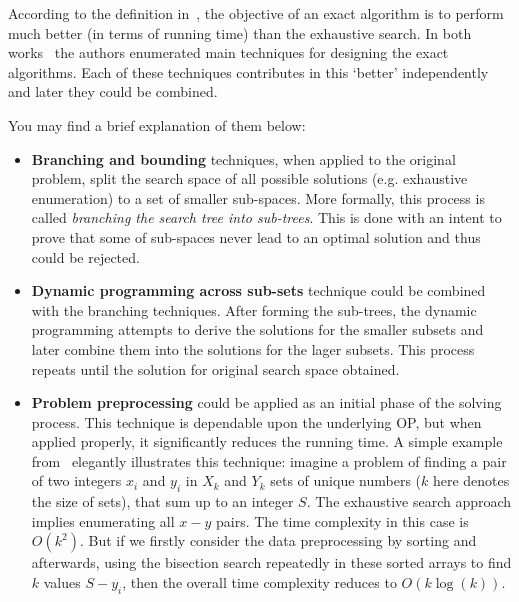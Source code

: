 According to the definition in~\cite{fomin2013exact}, the objective of an exact algorithm is to perform much better (in terms of running time) than the exhaustive search. In both works~\cite{woeginger2003exact,fomin2013exact} the authors enumerated main techniques for designing the exact algorithms. Each of these techniques contributes in this `better' independently and later they could be combined.

You may find a brief explanation of them below:
\begin{itemize}
	\item \textbf{Branching and bounding} techniques, when applied to the original problem, split the search space of all possible solutions (e.g. exhaustive enumeration) to a set of smaller sub-spaces. More formally, this process is called \emph{branching the search tree into sub-trees}. This is done with an intent to prove that some of sub-spaces never lead to an optimal solution and thus could be rejected.
	
	\item \textbf{Dynamic programming across sub-sets} technique could be combined with the  branching techniques. After forming the sub-trees, the dynamic programming attempts to derive the solutions for the smaller subsets and later combine them into the solutions for the lager subsets. This process repeats until the solution for original search space obtained.
	
	\item \textbf{Problem preprocessing} could be applied as an initial phase of the solving process. This technique is dependable upon the underlying OP, but when applied properly, it significantly reduces the running time. A simple example from~\cite{woeginger2003exact} elegantly illustrates this technique: imagine a problem of finding a pair of two integers $x_i$ and $y_i$ in $X_k$ and $Y_k$ sets of unique numbers ($k$ here denotes the size of sets), that sum up to an integer $S$. The exhaustive search approach implies enumerating all $x-y$ pairs. The time complexity in this case is $O(k^2)$. But if we firstly consider the data preprocessing by sorting and afterwards, using the bisection search repeatedly in these sorted arrays to find $k$ values $S - y_i$, then the overall time complexity reduces to $O(k\log(k))$.
\end{itemize}

